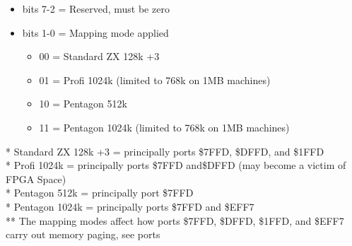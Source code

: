 \begin{itemize}
\item bits 7-2 = Reserved, must be zero
\item bits 1-0 = Mapping mode applied
  \begin{itemize}
  \item 00 = Standard ZX 128k +3
  \item 01 = Profi 1024k (limited to 768k on 1MB machines)
  \item 10 = Pentagon 512k
  \item 11 = Pentagon 1024k (limited to 768k on 1MB machines)
  \end{itemize}
\end{itemize}
* Standard ZX 128k +3 = principally ports \$7FFD, \$DFFD, and \$1FFD\\
* Profi 1024k = principally ports \$7FFD and\$DFFD (may become a victim of
FPGA Space)\\
* Pentagon 512k = principally port \$7FFD\\
* Pentagon 1024k = principally ports \$7FFD and \$EFF7\\
** The mapping modes affect how ports \$7FFD, \$DFFD, \$1FFD, and \$EFF7
carry out memory paging, see ports

